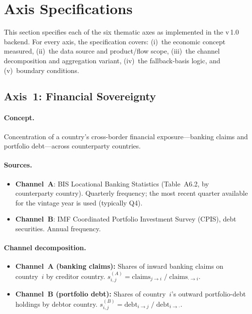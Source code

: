 \section{Axis Specifications}\label{sec:axis-specifications}

This section specifies each of the six thematic axes as implemented in the
\ISI v\,1.0 backend.  For every axis, the specification covers: (i)~the
economic concept measured, (ii)~the data source and product/flow scope,
(iii)~the channel decomposition and aggregation variant, (iv)~the
fallback-basis logic, and (v)~boundary conditions.

\subsection{Axis~1: Financial Sovereignty}\label{sec:axis:finance}

\paragraph{Concept.}
Concentration of a country's cross-border financial exposure---banking claims
and portfolio debt---across counterparty countries.

\paragraph{Sources.}
\begin{itemize}
  \item \textbf{Channel~A}: BIS Locational Banking Statistics (Table~A6.2,
    by counterparty country).  Quarterly frequency; the most recent quarter
    available for the vintage year is used (typically Q4).
  \item \textbf{Channel~B}: IMF Coordinated Portfolio Investment Survey
    (CPIS), debt securities.  Annual frequency.
\end{itemize}

\paragraph{Channel decomposition.}
\begin{itemize}
  \item \textbf{Channel~A (banking claims):}  Shares of inward banking
    claims on country~\(i\) by creditor country.
    \(s_{i,j}^{(A)} = \text{claims}_{j \rightarrow i} \;/\;
    \text{claims}_{\cdot \rightarrow i}\).
  \item \textbf{Channel~B (portfolio debt):}  Shares of country~\(i\)'s
    outward portfolio-debt holdings by debtor country.
    \(s_{i,j}^{(B)} = \text{debt}_{i \rightarrow j} \;/\;
    \text{debt}_{i \rightarrow \cdot}\).
\end{itemize}

